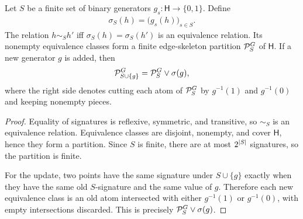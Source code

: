 \begin{theorem}
\label{thm:dgm-graph-partition:formal}
Let $S$ be a finite set of binary generators $g_s:\mathsf H\to\{0,1\}$. Define
\begin{align*}
\sigma_S(h)=\big(g_s(h)\big)_{s\in S}.
\end{align*}
The relation $h\sim_S h'$ iff $\sigma_S(h)=\sigma_S(h')$ is an equivalence relation. Its nonempty equivalence classes form a finite edge-skeleton partition $\mathcal{P}_S^G$ of $\mathsf H$. If a new generator $g$ is added, then
\begin{align*}
\mathcal{P}_{S\cup\{g\}}^G=\mathcal{P}_S^G\vee\sigma(g),
\end{align*}
where the right side denotes cutting each atom of $\mathcal{P}_S^G$ by $g^{-1}(1)$ and $g^{-1}(0)$ and keeping nonempty pieces.
\end{theorem}
\begin{proof}
Equality of signatures is reflexive, symmetric, and transitive, so $\sim_S$ is an equivalence relation. Equivalence classes are disjoint, nonempty, and cover $\mathsf H$, hence they form a partition. Since $S$ is finite, there are at most $2^{\left\lvert S\right\rvert}$ signatures, so the partition is finite.

For the update, two points have the same signature under $S\cup\{g\}$ exactly when they have the same old $S$-signature and the same value of $g$. Therefore each new equivalence class is an old atom intersected with either $g^{-1}(1)$ or $g^{-1}(0)$, with empty intersections discarded. This is precisely $\mathcal{P}_S^G\vee\sigma(g)$.
\end{proof}

